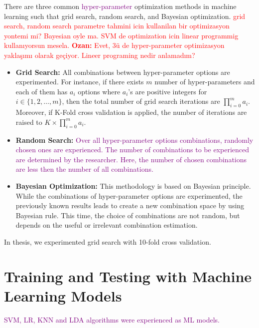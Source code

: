 There are three common \textcolor{purple}{hyper-parameter} optimization methods in machine learning such that grid search, random search, and Bayesian optimization.
\textcolor{red}{grid search, random search parametre tahmini icin kullanilan bir optimizasyon yontemi mi? Bayesian oyle ma. SVM de optimization icin linear programmig kullanıyorsun mesela. \textbf{Ozan:} Evet, 3ü de hyper-parameter optimizasyon yaklaşımı olarak geçiyor. Lineer programing nedir anlamadım?}


\begin{itemize}
	
	\item \textbf{Grid Search:} All combinations between hyper-parameter options are experimented. For instance, if there exists $m$ number of hyper-parameters and each of them has $a_{i}$ options where $a_{i}$'s are positive integers for $i \in \{1,2,\dots,m\}$, then the total number of grid search iterations are $\prod_{i=0}^{m} a_{i}$. Moreover, if K-Fold cross validation is applied, the number of iterations are raised to $K \times \prod_{i=0}^{m} a_{i}$.
	
	\item \textbf{Random Search:} \textcolor{purple}{Over all hyper-parameter options combinations, randomly chosen ones are experienced. The number of combinations to be experienced are determined by the researcher. Here, the number of chosen combinations are less then the number of all combinations.}
	
	\item \textbf{Bayesian Optimization:} This methodology is based on Bayesian principle. While the combinations of hyper-parameter options are experimented, the previously known results leads to create a new combination space by using Bayesian rule. This time, the choice of combinations are not random, but depends on the useful or irrelevant combination estimation.
	
\end{itemize}

In thesis, we experimented grid search with 10-fold cross validation.

\section{Training and Testing with Machine Learning Models} \label{CH5:train_test_ml}

\textcolor{purple}{SVM, LR, KNN and LDA algorithms were experienced as ML models.}

